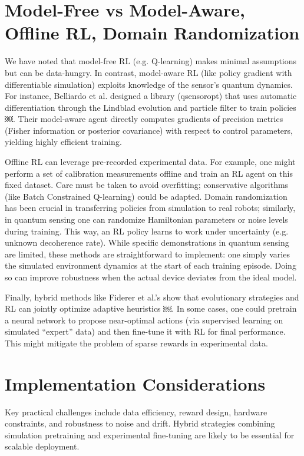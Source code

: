 \documentclass[
    aps,
    prx,
    reprint,
    superscriptaddress,
    amsmath,
    amssymb,
    longbibliography
]{revtex4-2}
\begin{document}
\section{Model-Free vs Model-Aware, Offline RL, Domain Randomization}

We have noted that model-free RL (e.g. Q-learning) makes minimal
assumptions but can be data-hungry.  In contrast, model-aware RL (like
policy gradient with differentiable simulation) exploits knowledge of
the sensor’s quantum dynamics.  For instance, Belliardo et
al. designed a library (qsensoropt) that uses automatic
differentiation through the Lindblad evolution and particle filter to
train policies ￼.  Their model-aware agent directly computes gradients
of precision metrics (Fisher information or posterior covariance) with
respect to control parameters, yielding highly efficient training.

Offline RL can leverage pre-recorded experimental data.  For example,
one might perform a set of calibration measurements offline and train
an RL agent on this fixed dataset.  Care must be taken to avoid
overfitting; conservative algorithms (like Batch Constrained
Q-learning) could be adapted. Domain randomization has been crucial in
transferring policies from simulation to real robots; similarly, in
quantum sensing one can randomize Hamiltonian parameters or noise
levels during training.  This way, an RL policy learns to work under
uncertainty (e.g. unknown decoherence rate). While specific
demonstrations in quantum sensing are limited, these methods are
straightforward to implement: one simply varies the simulated
environment dynamics at the start of each training episode. Doing so
can improve robustness when the actual device deviates from the ideal
model.

Finally, hybrid methods like Fiderer et al.’s show that evolutionary
strategies and RL can jointly optimize adaptive heuristics ￼. In some
cases, one could pretrain a neural network to propose near-optimal
actions (via supervised learning on simulated “expert” data) and then
fine-tune it with RL for final performance. This might mitigate the
problem of sparse rewards in experimental data.


\section{Implementation Considerations}

Key practical challenges include data efficiency, reward design,
hardware constraints, and robustness to noise and drift. Hybrid
strategies combining simulation pretraining and experimental fine-tuning
are likely to be essential for scalable deployment.
\end{document}
